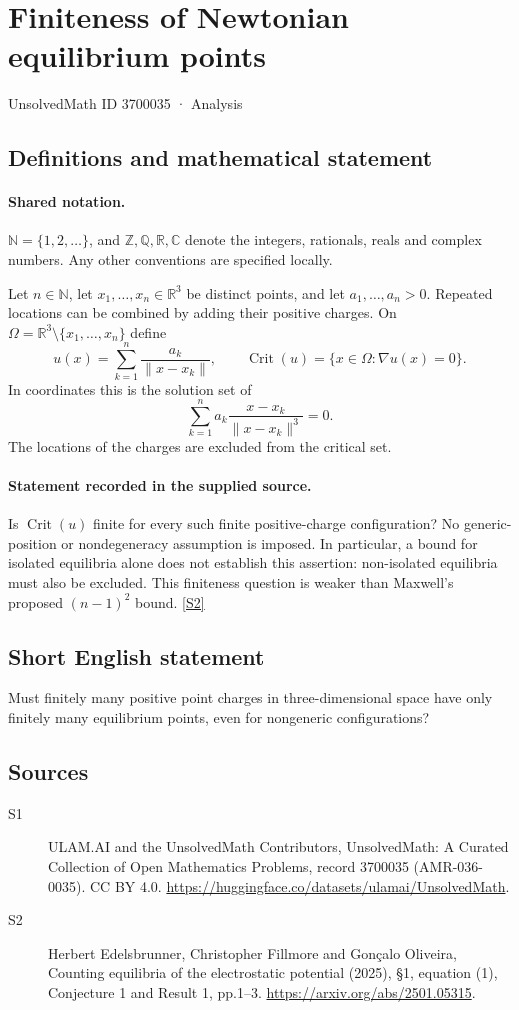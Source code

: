 \documentclass[11pt]{article}
\newcommand{\sref}[2]{\hyperlink{source:#1:#2}{[S#2]}}
\begin{document}
\setcounter{section}{3700034}
\section{Finiteness of Newtonian equilibrium points}\label{3700035}
{\small\sffamily UnsolvedMath ID 3700035 · Analysis}
\subsection{Definitions and mathematical statement}

\paragraph{Shared notation.}$\mathbb N=\{1,2,\ldots\}$, and $\mathbb Z,\mathbb Q,\mathbb R,\mathbb C$ denote the integers, rationals, reals and complex numbers. Any other conventions are specified locally.


Let $n\in\mathbb N$, let $x_1,\ldots,x_n\in\mathbb R^3$ be distinct points, and let $a_1,\ldots,a_n>0$. Repeated locations can be combined by adding their positive charges. On $\Omega=\mathbb R^3\setminus\{x_1,\ldots,x_n\}$ define
\[
 u(x)=\sum_{k=1}^{n}\frac{a_k}{\lVert x-x_k\rVert},\qquad
 \operatorname{Crit}(u)=\{x\in\Omega:\nabla u(x)=0\}.
\]
In coordinates this is the solution set of
\[
 \sum_{k=1}^{n}a_k\frac{x-x_k}{\lVert x-x_k\rVert^3}=0.
\]
The locations of the charges are excluded from the critical set.
\paragraph{Statement recorded in the supplied source.}
Is $\operatorname{Crit}(u)$ finite for every such finite positive-charge configuration? No generic-position or nondegeneracy assumption is imposed. In particular, a bound for isolated equilibria alone does not establish this assertion: non-isolated equilibria must also be excluded. This finiteness question is weaker than Maxwell's proposed $(n-1)^2$ bound. \sref{3700035}{2}
\subsection{Short English statement}
Must finitely many positive point charges in three-dimensional space have only finitely many equilibrium points, even for nongeneric configurations?
\subsection{Sources}
\begin{description}
\item[\hypertarget{source:3700035:1}{S1}] ULAM.AI and the UnsolvedMath Contributors, UnsolvedMath: A Curated Collection of Open Mathematics Problems, record 3700035 (AMR-036-0035). CC BY 4.0. \url{https://huggingface.co/datasets/ulamai/UnsolvedMath}.
\item[\hypertarget{source:3700035:2}{S2}] Herbert Edelsbrunner, Christopher Fillmore and Gonçalo Oliveira, Counting equilibria of the electrostatic potential (2025), §1, equation (1), Conjecture 1 and Result 1, pp.1–3. \url{https://arxiv.org/abs/2501.05315}.
\end{description}
\label{end:3700035}
\end{document}
